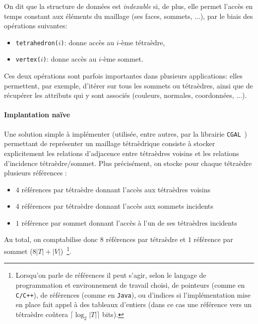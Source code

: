 On dit que la structure de données est \emph{indexable} si, de plus, elle permet l'accès en temps constant aux éléments du maillage (ses faces, sommets, ...), par le biais des opérations suivantes:
\begin{itemize}
\item \texttt{tetrahedron($i$)}: donne accès au $i$-ème tétraèdre,
\item \texttt{vertex($i$)}: donne accès au $i$-ème sommet.
\end{itemize}
Ces deux opérations sont parfois importantes dans plusieurs applications: elles permettent, par exemple, d'itérer sur tous les sommets ou tétraèdres,
ainsi que de récupérer les attributs qui y sont associés (couleurs, normales, coordonnées, ...).

\paragraph{Implantation naïve}
Une solution simple à implémenter (utilisée, entre autres, par la librairie \texttt{CGAL}~\cite{CGAL}) permettant de représenter un maillage tétraèdrique consiste à stocker explicitement les relations d'adjacence entre tétraèdres voisins et les relations d'incidence tétraèdre/sommet. Plus précisément, on stocke pour chaque tétraèdre plusieurs références : 
\begin{itemize}
\item $4$ références par tétraèdre donnant l'accès aux tétraèdres voisins
\item $4$ références par tétraèdre donnant l'accès aux sommets incidents
\item $1$ référence par sommet donnant l'accès à l'un de ses tétraèdres incidents
\end{itemize}
Au total, on comptabilise donc $8$ références par tétraèdre et $1$ référence par sommet ($8|T|+|V|$)~\footnote{Lorsqu'on parle de références il peut s'agir, selon le langage de programmation et environnement de travail choisi, de pointeurs (comme en \texttt{C/C++}), 
de références (comme en \texttt{Java}), ou d'indices si l'implémentation mise en place fait appel à des tableaux d'entiers (dans ce cas une référence vers un tétraèdre co\^utera
$\lceil\log_2 |T|\rceil$ bits).}.